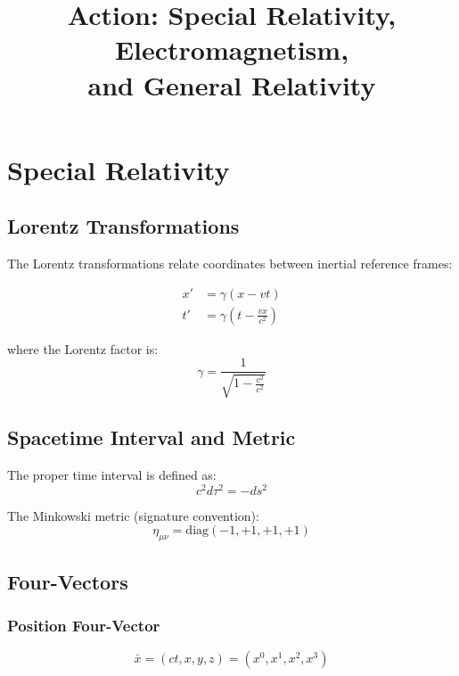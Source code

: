 \documentclass[11pt,a4paper]{article}
\title{\textbf{Action: Special Relativity, Electromagnetism, \\ and General Relativity}}
\author{}
\date{}
\begin{document}
\maketitle

\tableofcontents
\newpage

\section{Special Relativity}

\subsection{Lorentz Transformations}

The Lorentz transformations relate coordinates between inertial reference frames:

\begin{align}
x' &= \gamma(x - vt) \\
t' &= \gamma\left(t - \frac{vx}{c^2}\right)
\end{align}

where the Lorentz factor is:
\begin{equation}
\gamma = \frac{1}{\sqrt{1-\frac{v^2}{c^2}}}
\end{equation}

\subsection{Spacetime Interval and Metric}

The proper time interval is defined as:
\begin{equation}
c^2 d\tau^2 = -ds^2
\end{equation}

The Minkowski metric (signature convention):
\begin{equation}
\eta_{\mu\nu} = \text{diag}(-1, +1, +1, +1)
\end{equation}

\subsection{Four-Vectors}

\subsubsection{Position Four-Vector}
\begin{equation}
\bar{x} = (ct, x, y, z) = (x^0, x^1, x^2, x^3)
\end{equation}
\end{document}
